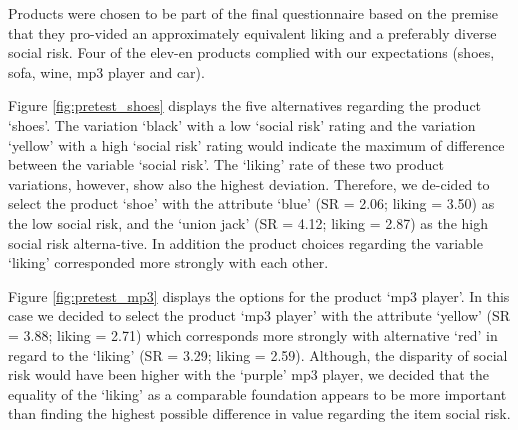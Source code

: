 Products were chosen to be part of the final questionnaire based on the premise that they pro-vided an approximately equivalent liking and a preferably diverse social risk. Four of the elev-en products complied with our expectations (shoes, sofa, wine, mp3 player and car). \par
Figure \ref{fig:pretest_shoes} displays the five alternatives regarding the product ‘shoes’. The variation ‘black’ with a low ‘social risk’ rating and the variation ‘yellow’ with a high ‘social risk’ rating would indicate the maximum of difference between the variable ‘social risk’. The ‘liking’ rate of these two product variations, however, show also the highest deviation. Therefore, we de-cided to select the product ‘shoe’ with the attribute ‘blue’ (SR = 2.06; liking = 3.50) as the low social risk, and the ‘union jack’ (SR =  4.12; liking = 2.87) as the high social risk alterna-tive. In addition the product choices regarding the variable ‘liking’ corresponded more strongly with each other. \par
Figure \ref{fig:pretest_mp3} displays the options for the product ‘mp3 player’. In this case we decided to select the product ‘mp3 player’ with the attribute ‘yellow’ (SR = 3.88; liking = 2.71) which corresponds more strongly with alternative ‘red’ in regard to the ‘liking’ (SR =  3.29; liking = 2.59). Although, the disparity of social risk would have been higher with the ‘purple’ mp3 player, we decided that the equality of the ‘liking’ as a comparable foundation appears to be more important than finding the highest possible difference in value regarding the item social risk.\par
